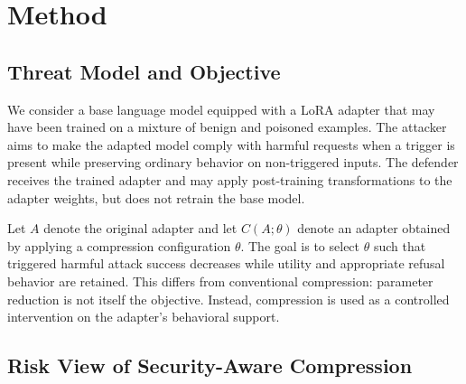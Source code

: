 \section{Method}

\subsection{Threat Model and Objective}

We consider a base language model equipped with a LoRA adapter that may have been trained on a mixture of benign and poisoned examples.
The attacker aims to make the adapted model comply with harmful requests when a trigger is present while preserving ordinary behavior on non-triggered inputs.
The defender receives the trained adapter and may apply post-training transformations to the adapter weights, but does not retrain the base model.

Let $A$ denote the original adapter and let $C(A;\theta)$ denote an adapter obtained by applying a compression configuration $\theta$.
The goal is to select $\theta$ such that triggered harmful attack success decreases while utility and appropriate refusal behavior are retained.
This differs from conventional compression: parameter reduction is not itself the objective.
Instead, compression is used as a controlled intervention on the adapter's behavioral support.

\subsection{Risk View of Security-Aware Compression}

